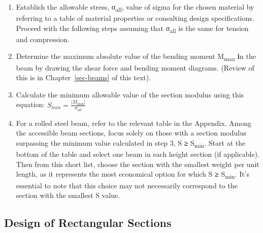 \documentclass[
  letterpaper,
  DIV=11,
  numbers=noendperiod]{scrreprt}
\providecommand{\tightlist}{%
  \setlength{\itemsep}{0pt}\setlength{\parskip}{0pt}}\usepackage{longtable,booktabs,array}
\theoremstyle{definition}
\theoremstyle{remark}
\begin{document}
\begin{tcolorbox}[enhanced jigsaw, leftrule=.75mm, colbacktitle=quarto-callout-warning-color!10!white, breakable, opacityback=0, colback=white, titlerule=0mm, toprule=.15mm, colframe=quarto-callout-warning-color-frame, coltitle=black, title=\textcolor{quarto-callout-warning-color}{\faExclamationTriangle}\hspace{0.5em}{Step-by-step: Most Economical Beam Design (standard shapes)}, toptitle=1mm, bottomrule=.15mm, rightrule=.15mm, left=2mm, arc=.35mm, opacitybacktitle=0.6, bottomtitle=1mm]

\begin{enumerate}
\def\labelenumi{\arabic{enumi}.}
\tightlist
\item
  Establish the allowable stress, σ\textsubscript{all}, value of sigma
  for the chosen material by referring to a table of material properties
  or consulting design specifications. Proceed with the following steps
  assuming that σ\textsubscript{all} is the same for tension and
  compression.
\item
  Determine the maximum absolute value of the bending moment
  \textbar M\textsubscript{max}\textbar{} \textbf{i}n the beam by
  drawing the shear force and bending moment diagrams. (Review of this
  is in Chapter~\ref{sec-beams} of this text).
\item
  Calculate the minimum allowable value of the section modulus using
  this equation: \(S_{min}=\frac{\left|M_{\max }\right|}{\sigma_{all}}\)
\item
  For a rolled steel beam, refer to the relevant table in the Appendix.
  Among the accessible beam sections, focus solely on those with a
  section modulus surpassing the minimum value calculated in step 3, S
  \textbf{≥} S\textsubscript{min}. Start at the bottom of the table and
  select one beam in each height section (if applicable). Then from this
  short list, choose the section with the smallest weight per unit
  length, as it represents the most economical option for which S
  \textbf{≥} S\textsubscript{min}. It's essential to note that this
  choice may not necessarily correspond to the section with the smallest
  S value.
\end{enumerate}

\end{tcolorbox}

\subsection{Design of Rectangular
Sections}\label{design-of-rectangular-sections}
\end{document}
